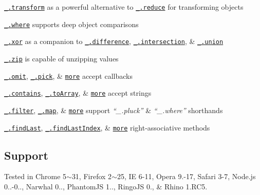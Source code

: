 \begin{DoxyItemize}
\item \href{https://lodash.com/docs#transform}{\tt \+\_\+.\+transform} as a powerful alternative to \href{https://lodash.com/docs#reduce}{\tt \+\_\+.\+reduce} for transforming objects
\item \href{https://lodash.com/docs#where}{\tt \+\_\+.\+where} supports deep object comparisons
\item \href{https://lodash.com/docs#xor}{\tt \+\_\+.\+xor} as a companion to \href{https://lodash.com/docs#difference}{\tt \+\_\+.\+difference}, \href{https://lodash.com/docs#intersection}{\tt \+\_\+.\+intersection}, \& \href{https://lodash.com/docs#union}{\tt \+\_\+.\+union}
\item \href{https://lodash.com/docs#zip}{\tt \+\_\+.\+zip} is capable of unzipping values
\item \href{https://lodash.com/docs#omit}{\tt \+\_\+.\+omit}, \href{https://lodash.com/docs#pick}{\tt \+\_\+.\+pick}, \& \href{https://lodash.com/docs}{\tt more} accept callbacks
\item \href{https://lodash.com/docs#contains}{\tt \+\_\+.\+contains}, \href{https://lodash.com/docs#toArray}{\tt \+\_\+.\+to\+Array}, \& \href{https://lodash.com/docs}{\tt more} accept strings
\item \href{https://lodash.com/docs#filter}{\tt \+\_\+.\+filter}, \href{https://lodash.com/docs#map}{\tt \+\_\+.\+map}, \& \href{https://lodash.com/docs}{\tt more} support {\itshape “\+\_\+.\+pluck”} \& {\itshape “\+\_\+.\+where”} shorthands
\item \href{https://lodash.com/docs#findLast}{\tt \+\_\+.\+find\+Last}, \href{https://lodash.com/docs#findLastIndex}{\tt \+\_\+.\+find\+Last\+Index}, \& \href{https://lodash.com/docs}{\tt more} right-\/associative methods
\end{DoxyItemize}

\subsection*{Support}

Tested in Chrome 5$\sim$31, Firefox 2$\sim$25, I\+E 6-\/11, Opera 9.-\/17, Safari 3-\/7, Node.\+js 0..-\/0.., Narwhal 0.., Phantom\+J\+S 1.., Ringo\+J\+S 0., \& Rhino 1.\+R\+C5. 